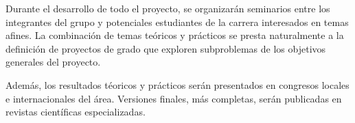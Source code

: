 
Durante el desarrollo de todo el proyecto, se organizar\'an seminarios
entre los integrantes del grupo y potenciales estudiantes de la carrera
interesados en temas afines.  La combinaci\'on de temas te\'oricos y
pr\'acticos se presta naturalmente a la definici\'on de proyectos de
grado que exploren subproblemas de los objetivos generales del proyecto.

Adem\'as, los resultados t\'eoricos y pr\'acticos ser\'an presentados en
congresos locales e internacionales del \'area.  Versiones finales, m\'as
completas, ser\'an publicadas en revistas cient\'ificas especializadas.
